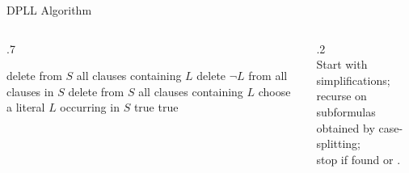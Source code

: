 \documentclass[t]{sdqbeamer}
\begin{document}
\begin{frame}{DPLL Algorithm}
	\centering
	\begin{minipage}{0.95\textwidth}
		\begin{columns}[T]
			\begin{column}{.7\linewidth}
				\begin{algorithm}[H]
					\DontPrintSemicolon
					\caption{DPLL(ClauseSet $S$)}
					\vspace*{2mm}
					 {
						delete from $S$ all clauses containing $L$ 
						delete $\lnot L$ from all clauses in $S$ 
					}
					\vspace*{1mm}
					 { 
						\Return {}  
					}
					\vspace*{1mm}
					 {
						delete from $S$ all clauses containing $L$ 
					}
					\vspace*{1mm}
					 { 
						\Return {}  
					}
					\vspace*{1mm}
					choose a literal $L$ occurring in $S$ 
					\vspace*{1mm}
					 { 
						\Return true  
					}
					 { 
						\Return true  
					}
				\end{algorithm}
			\end{column}
			\begin{column}{.2\linewidth}
				~\\[1em]
				Start with simplifications;\\[1em]
				recurse on subformulas obtained by case-splitting;\\[1em]
				stop if  found or .
			\end{column}
		\end{columns}
	\end{minipage}
\end{frame}
\end{document}

